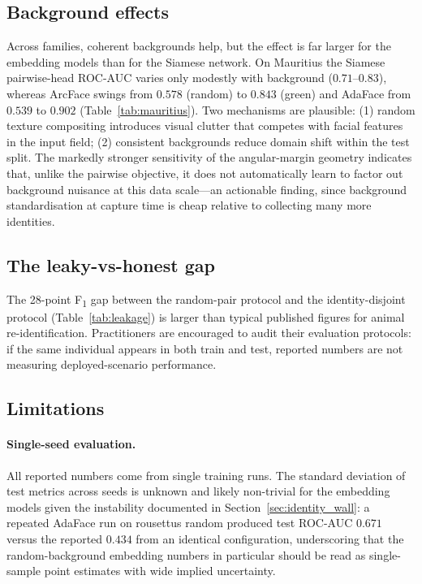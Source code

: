 \subsection{Background effects}

Across families, coherent backgrounds help, but the effect is far larger for the
embedding models than for the Siamese network.  On Mauritius the Siamese pairwise-head
ROC-AUC varies only modestly with background ($0.71$--$0.83$), whereas ArcFace swings
from $0.578$ (random) to $0.843$ (green) and AdaFace from $0.539$ to $0.902$
(Table~\ref{tab:mauritius}).  Two mechanisms are plausible: (1) random texture
compositing introduces visual clutter that competes with facial features in the input
field; (2) consistent backgrounds reduce domain shift within the test split.  The
markedly stronger sensitivity of the angular-margin geometry indicates that, unlike the
pairwise objective, it does not automatically learn to factor out background nuisance at
this data scale---an actionable finding, since background standardisation at capture
time is cheap relative to collecting many more identities.

\subsection{The leaky-vs-honest gap}

The 28-point F\textsubscript{1} gap between the random-pair protocol and the
identity-disjoint protocol (Table~\ref{tab:leakage}) is larger than typical published
figures for animal re-identification.  Practitioners are encouraged to audit their
evaluation protocols: if the same individual appears in both train and test, reported
numbers are not measuring deployed-scenario performance.

\subsection{Limitations}

\paragraph{Single-seed evaluation.}
All reported numbers come from single training runs.  The standard deviation of test
metrics across seeds is unknown and likely non-trivial for the embedding models given
the instability documented in Section~\ref{sec:identity_wall}: a repeated AdaFace run on
rousettus random produced test ROC-AUC $0.671$ versus the reported $0.434$ from an
identical configuration, underscoring that the random-background embedding numbers in
particular should be read as single-sample point estimates with wide implied
uncertainty.

